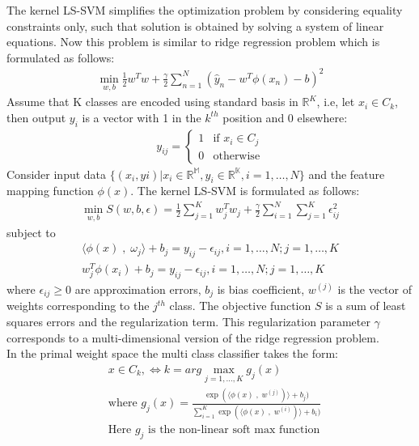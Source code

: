 \documentclass[conference]{IEEEtran}
\begin{document}
    The kernel LS-SVM simplifies the optimization problem by
    considering equality constraints only, such that solution is obtained by solving a system of linear equations.
    Now this problem is similar to ridge regression problem which is formulated as follows:
    \begin{align}
        \min_{w,b} \frac{1}{2}w^{T}w + \frac{\gamma}{2}\sum_{n=1}^{N}(\hat{y}_{n} - w^{T}\phi(x_{n}) - b)^{2}
    \end{align}
    Assume that K classes are encoded using standard basis in $\mathbb{R}^{K}$, i.e, let $x_{i} \in C_{k}$, then output
    $ y_{i}$ is a vector with 1 in the $k^{th}$ position and 0 elsewhere:
    \begin{align}
        y_{ij} = \begin{cases}
                     1 & \text{if } x_{i} \in C_{j} \\
                     0 & \text{otherwise}
        \end{cases}
    \end{align}
    Consider input data $\{(x_{i},y{i}) | x_{i}\in\mathbb{R^{M}},y_{i}\in\mathbb{R^{K}}, i = 1,\ldots,N\}$ and the
    feature mapping function $\phi(x)$.
    The kernel LS-SVM is formulated as follows:
    \begin{align}
        \min_{w,b} S(w,b,\epsilon) = \frac{1}{2}\sum_{j=1}^{K}w_{j}^{T}w_{j} + \frac{\gamma}{2}\sum_{i=1}^{N}\sum_{j=1}^{K}\epsilon_{ij}^{2}
    \end{align}
    subject to
    \begin{align}
        \langle \phi(x) \;,\; \omega_{j}  \rangle + b_{j} = y_{ij} - \epsilon_{ij}, i = 1,\ldots,N; j = 1,\ldots,K \\
        w_{j}^{T}\phi(x_{i}) + b_{j} = y_{ij} - \epsilon_{ij} , i = 1,\ldots,N; j = 1,\ldots,K
    \end{align}
    where $\epsilon_{ij} \geq 0$ are approximation errors, $b_{j}$ is bias coefficient, $w^{(j)}$ is the vector of
    weights corresponding to the $j^{th}$ class.
    The objective function $S$ is a sum of least squares errors and the
    regularization term.
    This regularization parameter $\gamma$ corresponds to a multi-dimensional version of the ridge
    regression problem.\\
    In the primal weight space the multi class classifier takes the form:
    \begin{align*}
        & x \in C_{k}, \Leftrightarrow k= arg \max_{j=1,\ldots,K} g_{j}(x) \\
        & \text{where } g_{j}(x) = \frac{\exp(\langle \phi(x)\;,\; w^{(j)})\rangle + b_{j})}{\sum_{i=1}^{K} \exp(\langle \phi(x)\;,\; w^{(i)})\rangle + b_{i})} \\
        & \text{Here $g_{j}$ is the non-linear soft max function}
    \end{align*}
\end{document}
